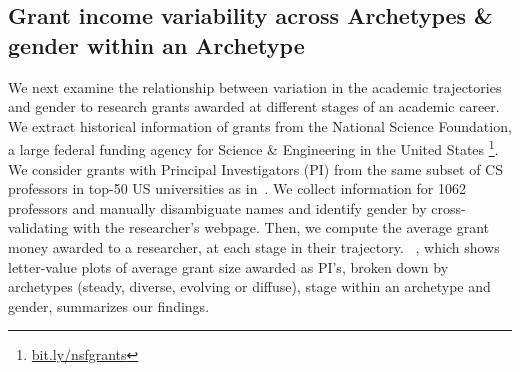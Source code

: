 \subsection{Grant income variability across Archetypes \& gender within an Archetype}
\label{sec:grant}
We next examine the relationship between variation in the academic trajectories and gender to research grants awarded at different stages of an academic career. We extract historical information of grants from the National Science Foundation, a large federal funding agency for Science \& Engineering in the United States \footnote{\url{bit.ly/nsfgrants}}. We consider grants with Principal Investigators (PI) from the same subset of CS professors in top-50 US universities as in~. We collect information for 1062 professors and manually disambiguate names and identify gender by cross-validating with the researcher's webpage.
Then, we compute the average grant money awarded to a researcher, at each stage in their trajectory. ~, which shows letter-value plots of average grant size awarded as PI's, broken down by archetypes (steady, diverse, evolving or diffuse), stage within an archetype and gender, summarizes our findings.

